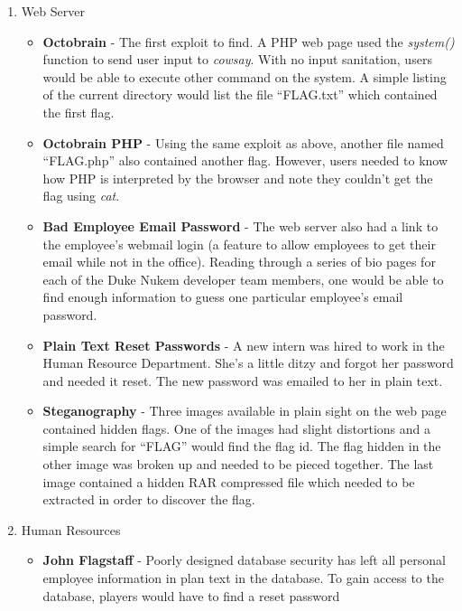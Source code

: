 \documentclass[10pt]{article}
\begin{document}
\begin{enumerate}
  \item Web Server
      \begin{itemize}
        \item \textbf{Octobrain} - The first exploit to find. A PHP web page
        used the \textit{system()} function to send user input to
        \textit{cowsay}. With no input sanitation, users would be able to
        execute other command on the system. A simple listing of the current
        directory would list the file ``FLAG.txt'' which contained the first
        flag.
        \item \textbf{Octobrain PHP} - Using the same exploit as above, another
        file named ``FLAG.php'' also contained another flag. However, users
        needed to know how PHP is interpreted by the browser and note they
        couldn't get the flag using \textit{cat}.
        \item \textbf{Bad Employee Email Password} - The web server also had a
        link to the employee's webmail login (a feature to allow employees to
        get their email while not in the office). Reading through a series of
        bio pages for each of the Duke Nukem developer team members, one would
        be able to find enough information to guess one particular employee's
        email password.
        \item \textbf{Plain Text Reset Passwords} - A new intern was hired to
        work in the Human Resource Department. She's a little ditzy and forgot
        her password and needed it reset. The new password was emailed to her in
        plain text.
        \item \textbf{Steganography} - Three images available in plain sight on
        the web page contained hidden flags. One of the images had slight
        distortions and a simple search for ``FLAG'' would find the flag id.
        The flag hidden in the other image was broken up and needed to be pieced
        together. The last image contained a hidden RAR compressed file which
        needed to be extracted in order to discover the flag.        
      \end{itemize}
  \item Human Resources
      \begin{itemize}
        \item \textbf{John Flagstaff} - Poorly designed database security has
        left all personal employee information in plan text in the database. To
        gain access to the database, players would have to find a reset password

\end{itemize}
\end{enumerate}
\end{document}

